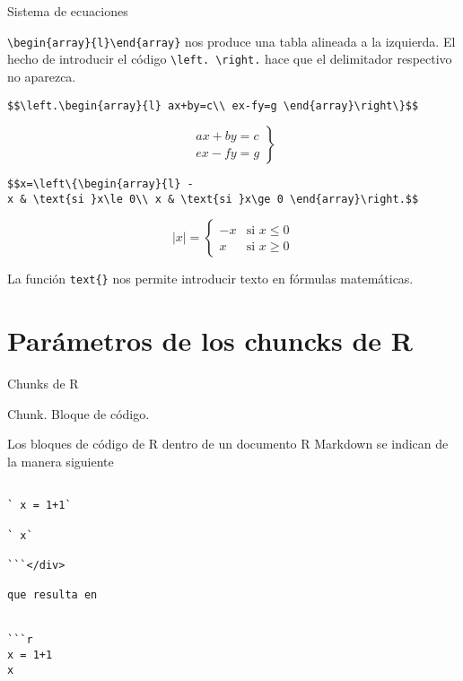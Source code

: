 \documentclass[
  ignorenonframetext,
]{beamer}
\begin{document}
\begin{frame}[fragile]{Sistema de ecuaciones}
\protect\hypertarget{sistema-de-ecuaciones}{}

\texttt{\textbackslash{}begin\{array\}\{l\}\textbackslash{}end\{array\}}
nos produce una tabla alineada a la izquierda. El hecho de introducir el
código \texttt{\textbackslash{}left.\ \textbackslash{}right.} hace que
el delimitador respectivo no aparezca.

\texttt{\$\$\textbackslash{}left.\textbackslash{}begin\{array\}\{l\}\ ax+by=c\textbackslash{}\textbackslash{}\ ex-fy=g\ \textbackslash{}end\{array\}\textbackslash{}right\textbackslash{}\}\$\$}

\[\left.\begin{array}{l}
ax+by=c\\
ex-fy=g
\end{array}\right\}\]

\texttt{\$\$\textbar{}x\textbar{}=\textbackslash{}left\textbackslash{}\{\textbackslash{}begin\{array\}\{l\}\ -x\ \&\ \textbackslash{}text\{si\ \}x\textbackslash{}le\ 0\textbackslash{}\textbackslash{}\ x\ \&\ \textbackslash{}text\{si\ \}x\textbackslash{}ge\ 0\ \textbackslash{}end\{array\}\textbackslash{}right.\$\$}

\[|x|=\left\{\begin{array}{l}
-x & \text{si }x\le 0\\
x & \text{si }x\ge 0
\end{array}\right.\]

La función \texttt{text\{\}} nos permite introducir texto en fórmulas
matemáticas.

\end{frame}

\hypertarget{paruxe1metros-de-los-chuncks-de-r}{%
\section{Parámetros de los chuncks de
R}\label{paruxe1metros-de-los-chuncks-de-r}}

\begin{frame}[fragile]{Chunks de R}
\protect\hypertarget{chunks-de-r}{}

Chunk. Bloque de código.

Los bloques de código de R dentro de un documento R Markdown se indican
de la manera siguiente

\begin{verbatim}

` x = 1+1`

` x`

```</div>

que resulta en


```r
x = 1+1
x
\end{verbatim}

\end{frame}
\end{document}
